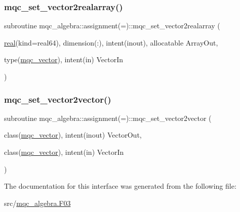 \mbox{\label{interfacemqc__algebra_1_1assignment_07_0A_08_a316e66a9543345cd98c8cf7ec883d9a9}} 
\subsubsection{\texorpdfstring{mqc\_set\_vector2realarray()}{mqc\_set\_vector2realarray()}}
{\footnotesize\ttfamily subroutine mqc\+\_\+algebra\+::assignment(=)\+::mqc\+\_\+set\+\_\+vector2realarray (\begin{DoxyParamCaption}\item[{\mbox{\hyperlink{interfacemqc__algebra_1_1real}{real}}(kind=real64), dimension(\+:), intent(inout), allocatable}]{Array\+Out,  }\item[{type(\mbox{\hyperlink{structmqc__algebra_1_1mqc__vector}{mqc\+\_\+vector}}), intent(in)}]{Vector\+In }\end{DoxyParamCaption})}

\mbox{\label{interfacemqc__algebra_1_1assignment_07_0A_08_a7b6d597ccd93a1c1f82aa261ff2dffde}} 
\subsubsection{\texorpdfstring{mqc\_set\_vector2vector()}{mqc\_set\_vector2vector()}}
{\footnotesize\ttfamily subroutine mqc\+\_\+algebra\+::assignment(=)\+::mqc\+\_\+set\+\_\+vector2vector (\begin{DoxyParamCaption}\item[{class(\mbox{\hyperlink{structmqc__algebra_1_1mqc__vector}{mqc\+\_\+vector}}), intent(inout)}]{Vector\+Out,  }\item[{class(\mbox{\hyperlink{structmqc__algebra_1_1mqc__vector}{mqc\+\_\+vector}}), intent(in)}]{Vector\+In }\end{DoxyParamCaption})}



The documentation for this interface was generated from the following file\+:\begin{DoxyCompactItemize}
\item 
src/\mbox{\hyperlink{mqc__algebra_8_f03}{mqc\+\_\+algebra.\+F03}}\end{DoxyCompactItemize}
